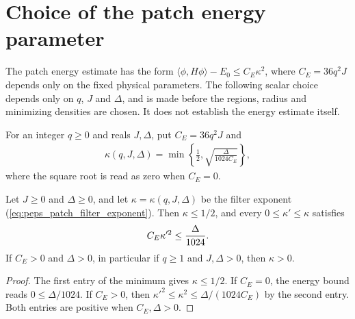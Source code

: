 \section{Choice of the patch energy parameter}
\label{sec:peps_patch_energy_choice}

The patch energy estimate has the form
$\langle\phi,H\phi\rangle-E_0\le C_E\kappa^2$, where
$C_E=36q^2J$ depends only on the fixed physical parameters.
The following scalar choice depends only on $q$, $J$ and $\Delta$, and is
made before the regions, radius and minimizing densities are chosen. It does
not establish the energy estimate itself.

\begin{definition}
    \label{def:peps_patch_filter_exponent}
    \leanok
    For an integer $q\ge0$ and reals $J,\Delta$, put $C_E=36q^2J$ and
    \begin{align}
        \kappa(q,J,\Delta)=\min\left\{\frac12,
        \sqrt{\frac{\Delta}{1024C_E}}\right\},
        \label{eq:peps_patch_filter_exponent}
    \end{align}
    where the square root is read as zero when $C_E=0$.
\end{definition}

\begin{lemma}
    \label{lem:peps_patch_energy_parameter_choice}
    \leanok
    Let $J\ge0$ and $\Delta\ge0$, and let $\kappa=\kappa(q,J,\Delta)$ be the
    filter exponent (\ref{eq:peps_patch_filter_exponent}). Then
    $\kappa\le1/2$, and every $0\le\kappa'\le\kappa$ satisfies
    \begin{align}
        C_E\kappa'^2\le\frac{\Delta}{1024}.\notag
    \end{align}
    If $C_E>0$ and $\Delta>0$, in particular if $q\ge1$ and $J,\Delta>0$, then
    $\kappa>0$.
\end{lemma}
\begin{proof}
    \leanok
    The first entry of the minimum gives $\kappa\le1/2$. If $C_E=0$, the
    energy bound reads $0\le\Delta/1024$. If $C_E>0$, then
    $\kappa'^2\le\kappa^2\le\Delta/(1024C_E)$ by the second entry. Both
    entries are positive when $C_E,\Delta>0$.
\end{proof}

